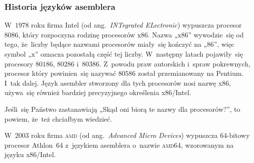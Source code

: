 \documentclass[10pt,t]{beamer}
\begin{document}










\appendix
















\begin{frame}
  \frametitle{Historia języków asemblera}


  W~$1978$ roku firma Intel (od ang.~\textit{INTegrated ELectronic})
  wypuszcza procesor $8086$, który rozpoczyna rodzinę procesorów
  $\text{x}86$. Nazwa „$\text{x}86$” wywodzie~się od tego, że~liczby
  będące nazwami procesorów miały~się kończyć na „$86$”, więc symbol
  „$\text{x}$” oznacza pozostałą część tej liczby. W~następny latach
  pojawiły~się procesory $80186$, $80286$ i~$80386$. Z~powodu praw
  autorskich i~spraw pokrewnych, procesor który powinien~się nazywać
  $80586$ został przemianowany na Pentium. I~tak dalej. Język asembler
  stworzony dla tych procesorów nosi nazwę \alert{x86}, używa~się również
  bardziej precyzyjnego określenia \alert{x86/Intel}.

  Jeśli~się Państwo zastanawiają „Skąd oni biorą te nazwy dla procesorów?”,
  to powiem, że~też chciałbym wiedzieć.

  W~$2003$ roku firma \textsc{amd} (od ang.~\textit{Advanced Micro Devices})
  wypuszcza 64-bitowy procesor Athlon~64 z~językiem asemblera o~nazwie
  \textsc{amd}64, wzorowanym na języku x86/Intel.

\end{frame}
\end{document}
